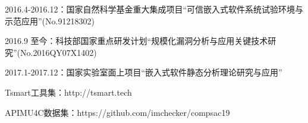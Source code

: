 \begin{resume}
  \begin{achievements}
  	\item 2016.4-2016.12：国家自然科学基金重大集成项目“可信嵌入式软件系统试验环境与示范应用”(No.91218302)
  	\item 2016.9 至今：科技部国家重点研发计划“规模化漏洞分析与应用关键技术研究”(No.2016QY07X1402)
  	\item 2017.1-2017.12：国家实验室面上项目“嵌入式软件静态分析理论研究与应用”
  	
  \end{achievements}

  \begin{achievements}
    \item Tsmart工具集：http://tsmart.tech
    \item APIMU4C数据集：https://github.com/imchecker/compsac19
  \end{achievements}

\end{resume}
